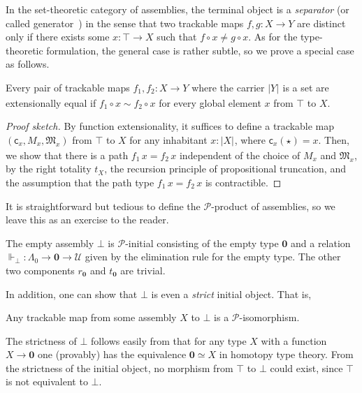 \documentclass[a4paper,UKenglish,numberwithinsect,cleveref,thm-restate]{lipics-v2021}
\newcommand{\eqv}[2]{\ensuremath{#1 \simeq #2}\xspace}
\newcommand{\tproj}[3][]{\mathopen{}\left|#3\right|_{#2}^{#1}\mathclose{}}
\newcommand{\bproj}[1]{\tproj{}{#1}}
\newcommand{\PP}{\mathscr{P}}
\newcommand{\Univ}{\mathcal{U}}
\newcommand{\Empty}{\mathbf{0}}
\theoremstyle{plain}
\begin{document}
In the set-theoretic category of assemblies, the terminal object is a \emph{separator} (or called generator~\cite{MacLane1994}) in the sense that two trackable maps $f, g \colon X \to Y$ are distinct only if there exists some $x \colon \top \to X$ such that $f\circ x \neq g \circ x$.
As for the type-theoretic formulation, the general case is rather subtle, so we prove a special case as follows.
\begin{proposition}
  Every pair of trackable maps $f_1, f_2 : X \to Y$ where the carrier $\bproj{Y}$ is a set are extensionally equal if $f_1 \circ x \sim f_2 \circ x$ for every global element $x$ from $\top$ to $X$. 
\end{proposition}
\begin{proof}[Proof sketch]
  By function extensionality, it suffices to define a trackable map $(\mathsf{c}_x, M_x, \mathfrak{M}_x)$ from $\top$ to $X$ for any inhabitant $x : \bproj{X}$, where $\mathsf{c}_x(\star) = x$.
  Then, we show that there is a path $f_1\,x = f_2\,x$ independent of the choice of $M_x$ and $\mathfrak{M}_x$, by the right totality $t_X$, the recursion principle of propositional truncation, and the assumption that the path type $f_1\,x = f_2\,x$ is contractible. 
\end{proof}

It is straightforward but tedious to define the $\PP$-product of assemblies, so we leave this as an exercise to the reader. 
\begin{example}
The empty assembly $\bot$ is $\PP$-initial consisting of the empty type $\Empty$ and a relation $\Vdash_\bot : \Lambda_0 \to \Empty \to \Univ$ given by the elimination rule for the empty type.
The other two components $r_\Empty$ and $t_\Empty$ are trivial.
\end{example}

In addition, one can show that $\bot$ is even a \emph{strict} initial object. That is, 
\begin{proposition}\label{prop:strict-initial}
  Any trackable map from some assembly $X$ to $\bot$ is a $\PP$-isomorphism. 
\end{proposition}
The strictness of $\bot$ follows easily from that for any type $X$ with a function $X \to \Empty$ one (provably) has the equivalence $\eqv{\Empty}{X}$ in homotopy type theory.
From the strictness of the initial object, no morphism from $\top$ to $\bot$ could exist, since $\top$ is not equivalent to $\bot$.
\end{document}
